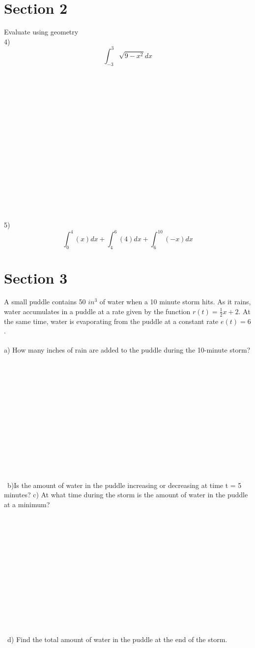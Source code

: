 \documentclass[12pt]{article}
\begin{document}
\section{Section 2}
Evaluate using geometry \\
4)$$\int_{-3}^{3} \sqrt{9-x^2} dx $$
\\\\\\\\\\\\\\\\\\\\\\\\\\\\\\\\
5) $$\int_{0}^{4}(x)dx + \int_{4}^{6}(4)dx + \int_{6}^{10}(-x)dx$$
\newpage
\section{Section 3}
A small puddle contains 50 $in^3$ of water when a 10 minute storm hits. As it rains, water accumulates in a puddle at a rate given by the function $r(t) = \frac{1}{2}x+2$. At the same time, water is evaporating from the puddle at a constant rate $e(t) = 6$.\\\\
a) How many inches of rain are added to the puddle during the 10-minute storm?\\\\\\\\\\\\\\\\\\\\\\\\\\\\\
b)Is the amount of water in the puddle increasing or decreasing at time t = 5 minutes?
\newpage
c) At what time during the storm is the amount of water in the puddle at a minimum?\\\\\\\\\\\\\\\\\\\\\\\\\\\\\
d) Find the total amount of water in the puddle at the end of the storm.




 
 
\end{document}

